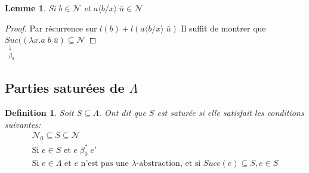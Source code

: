 \documentclass{article}
\newtheorem{lemma}{Lemme}
\newtheorem{defi}{Definition}
\newcommand\subst[2]{\langle #1\big/#2\rangle}
\newcommand\lterm[2]{\lambda #1. #2}
\newcommand\tlambda[0]{$\lambda$}
\begin{document}
\begin{lemma}
Si $b\in \mathcal{N}$ et $a\subst{b}{x}\; \bar{u} \in \mathcal{N}$
\end{lemma}
\begin{proof}
Par récurrence sur $l(b) + l(a\subst{b}{x}\; \bar{u})$
Il suffit de montrer que $\underset{\substack{\downarrow\\ \beta_0}}{Suc}((\lterm{x}{a}\; b\; \bar{u}) \subseteq \mathcal{N}$
\end{proof}

\subsection{Parties saturées de $\Lambda$}
\begin{defi}
Soit $S\subseteq \Lambda$. Ont dit que $S$ est \emph{saturée} si elle satisfait les conditions suivantes:
\begin{align*}
\mathcal{N}_0 \subseteq S \subseteq \mathcal{N} \tag{Sat 1}\\
\text{Si } e\in S \text{ et } e\;\beta_0^*\;e'\tag{Sat 2}\\
\text{Si $e\in \Lambda$ et $e$ n'est pas une \tlambda-abstraction, et si } Succ(e)\subseteq S, e\in S\tag{Sat 3}
\end{align*}

\end{defi}
\end{document}
